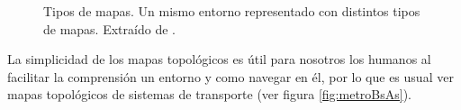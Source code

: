 \begin{figure}[H]
  \centering
  \qquad
  \qquad
  \caption[Tipos de mapas.]{Tipos de mapas. Un mismo entorno representado con distintos tipos de mapas. Extraído de \cite{choset2005principles}.}
\end{figure}

La simplicidad de los mapas topológicos es útil para nosotros los humanos al facilitar la comprensión un entorno y como navegar en él, por lo que es usual ver mapas topológicos de sistemas de transporte (ver figura \ref{fig:metroBsAs}).%

